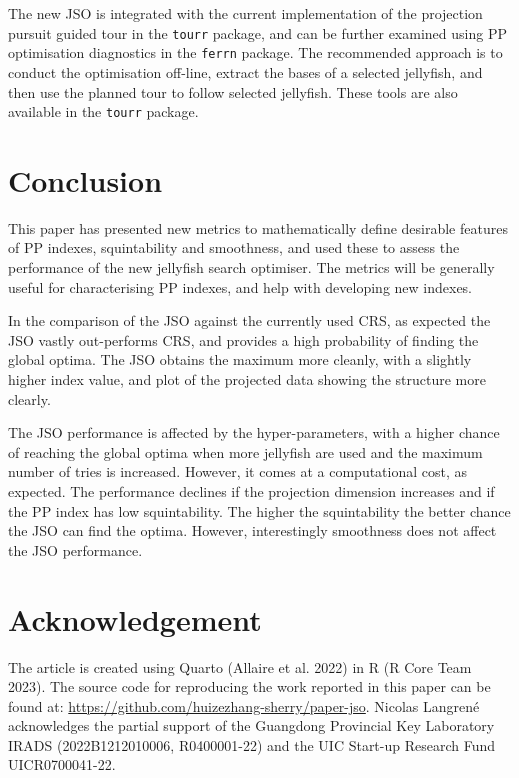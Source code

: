\documentclass[
  12pt,
]{interact}
\theoremstyle{plain}
\begin{document}
The new JSO is integrated with the current implementation of the
projection pursuit guided tour in the \texttt{tourr} package, and can be
further examined using PP optimisation diagnostics in the \texttt{ferrn}
package. The recommended approach is to conduct the optimisation
off-line, extract the bases of a selected jellyfish, and then use the
planned tour to follow selected jellyfish. These tools are also
available in the \texttt{tourr} package.

\hypertarget{sec-conclusion}{%
\section{Conclusion}\label{sec-conclusion}}

This paper has presented new metrics to mathematically define desirable
features of PP indexes, squintability and smoothness, and used these to
assess the performance of the new jellyfish search optimiser. The
metrics will be generally useful for characterising PP indexes, and help
with developing new indexes.

In the comparison of the JSO against the currently used CRS, as expected
the JSO vastly out-performs CRS, and provides a high probability of
finding the global optima. The JSO obtains the maximum more cleanly,
with a slightly higher index value, and plot of the projected data
showing the structure more clearly.

The JSO performance is affected by the hyper-parameters, with a higher
chance of reaching the global optima when more jellyfish are used and
the maximum number of tries is increased. However, it comes at a
computational cost, as expected. The performance declines if the
projection dimension increases and if the PP index has low
squintability. The higher the squintability the better chance the JSO
can find the optima. However, interestingly smoothness does not affect
the JSO performance.

\hypertarget{acknowledgement}{%
\section{Acknowledgement}\label{acknowledgement}}

The article is created using Quarto (Allaire et al. 2022) in R (R Core
Team 2023). The source code for reproducing the work reported in this
paper can be found at:
\url{https://github.com/huizezhang-sherry/paper-jso}. Nicolas Langrené
acknowledges the partial support of the Guangdong Provincial Key
Laboratory IRADS (2022B1212010006, R0400001-22) and the UIC Start-up
Research Fund UICR0700041-22.
\end{document}

